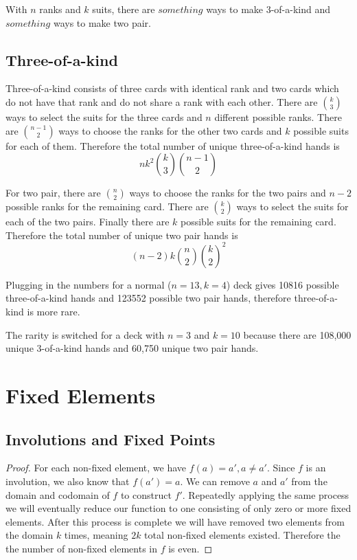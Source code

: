 \documentclass[12pt]{article}
\begin{document}
With $n$ ranks and $k$ suits, there are $something$ ways to make 3-of-a-kind and $something$ ways to make two pair. 

\subsection*{Three-of-a-kind}

Three-of-a-kind consists of three cards with identical rank and two cards which do not have that rank and do not share a rank with each other. There are $\binom{k}{3}$ ways to select the suits for the three cards and $n$ different possible ranks. There are $\binom{n-1}{2}$ ways to choose the ranks for the other two cards and $k$ possible suits for each of them. Therefore the total number of unique three-of-a-kind hands is 
\[
nk^2\binom{k}{3}\binom{n-1}{2}
\]

For two pair, there are $\binom{n}{2}$ ways to choose the ranks for the two pairs and $n-2$ possible ranks for the remaining card. There are $\binom{k}{2}$ ways to select the suits for each of the two pairs. Finally there are $k$ possible suits for the remaining card. Therefore the total number of unique two pair hands is
\[
(n-2)k\binom{n}{2}\binom{k}{2}^2
\]

Plugging in the numbers for a normal ($n=13, k=4$) deck gives 10816 possible three-of-a-kind hands and 123552 possible two pair hands, therefore three-of-a-kind is more rare.

The rarity is switched for a deck with $n=3$ and $k=10$ because there are 108,000 unique 3-of-a-kind hands and 60,750 unique two pair hands.


\section{Fixed Elements}

\subsection*{Involutions and Fixed Points}

\begin{proof}
For each non-fixed element, we have $f(a) = a', a \neq a'$. Since $f$ is an involution, we also know that $f(a') = a$. We can remove $a$ and $a'$ from the domain and codomain of $f$ to construct $f'$. Repeatedly applying the same process we will eventually reduce our function to one consisting of only zero or more fixed elements. After this process is complete we will have removed two elements from the domain $k$ times, meaning $2k$ total non-fixed elements existed. Therefore the the number of non-fixed elements in $f$ is even.\end{proof}
\end{document}
